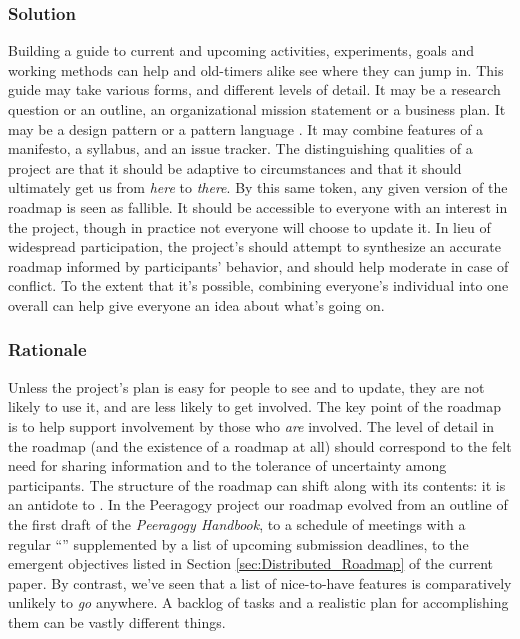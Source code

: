 \subsubsection*{Solution} Building a guide to current and upcoming activities, experiments, goals and working methods can help  and old-timers alike see where they can jump in.  This guide may take various forms, and different levels of detail.  It may be a research question or an outline, an organizational mission statement or a business plan.  It may be a design pattern or a pattern language \cite{kohls2010structure}. It may combine features of a manifesto, a syllabus, and an issue tracker.  The distinguishing qualities of a project  are that it should be adaptive to circumstances and that it should ultimately get us from \emph{here} to \emph{there}.  By this same token, any given version of the roadmap is seen as fallible.  It should be accessible to everyone with an interest in the project, though in practice not everyone will choose to update it.  In lieu of widespread participation, the project's  should attempt to synthesize an accurate roadmap informed by participants' behavior, and should help moderate in case of conflict.  To the extent that it's possible, combining everyone's individual  into one overall  can help give everyone an idea about what's going on.

\subsubsection*{Rationale} Unless the project's plan is easy for people to see and to update, they are not likely to use it, and are less likely to get involved.  The key point of the roadmap is to help support involvement by those who \emph{are} involved.   The level of detail in the roadmap (and the existence of a roadmap at all) should correspond to the felt need for sharing information and to the tolerance of uncertainty among participants.
The structure of the roadmap can shift along with its contents: it is an antidote to  \cite[pp. 121--124]{david2001software}. 
In the Peeragogy project our roadmap evolved from an outline of the first draft of the
\emph{Peeragogy Handbook}, to a schedule of meetings with a regular
``'' supplemented by a list of upcoming submission deadlines, to the emergent objectives listed in Section \ref{sec:Distributed_Roadmap} of the current paper.
By contrast, we've seen that a list of nice-to-have features is comparatively
unlikely to \emph{go} anywhere.  A backlog of tasks and a realistic
plan for accomplishing them can be vastly different things.

